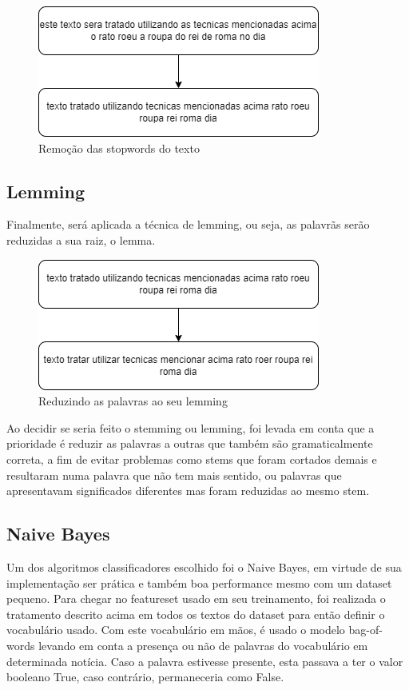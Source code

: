 \documentclass[conference]{IEEEtran}
\begin{document}
\begin{figure}[htbp]
\centerline{\includegraphics[scale=0.5]{figura2.png}}
\caption{Remoção das stopwords do texto}
\label{fig}
\end{figure}

\subsection{Lemming}
Finalmente, será aplicada a técnica de lemming, ou seja, as palavrãs serão reduzidas a sua raiz, o lemma. 

\begin{figure}[htbp]
\centerline{\includegraphics[scale=0.5]{figura3.png}}
\caption{Reduzindo as palavras ao seu lemming}
\label{fig}
\end{figure}

Ao decidir se seria feito o stemming ou lemming, foi levada em conta que a prioridade é reduzir as palavras a outras que também são gramaticalmente correta, a fim de evitar problemas como stems que foram cortados demais e resultaram numa palavra que não tem mais sentido, ou palavras que apresentavam significados diferentes mas foram reduzidas ao mesmo stem. 

\subsection{Naive Bayes}

Um dos algoritmos classificadores escolhido foi o Naive Bayes, em virtude de sua implementação ser prática e também boa performance mesmo com um dataset pequeno. Para chegar no featureset usado em seu treinamento, foi realizada o tratamento descrito acima em todos os textos do dataset para então definir o vocabulário usado. Com este vocabulário em mãos, é usado o modelo bag-of-words levando em conta a presença ou não de palavras do vocabulário em determinada notícia. Caso a palavra estivesse presente, esta passava a ter o valor booleano True, caso contrário, permaneceria como False. 
\end{document}
